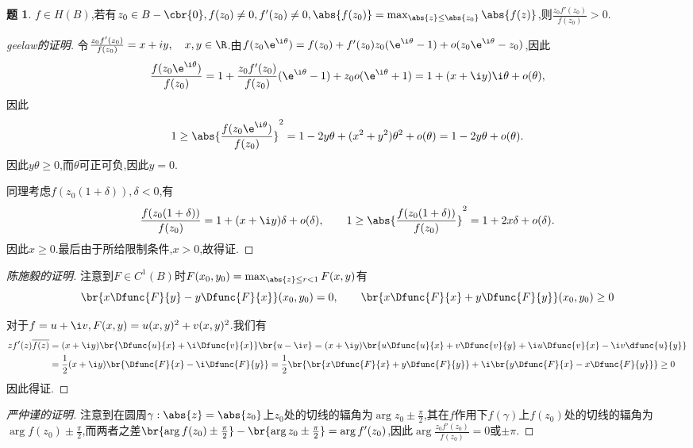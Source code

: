 \documentclass{article}
\theoremstyle{definition}
\newtheorem{exercise}{题}[section]
\begin{document}
\begin{exercise}
    $f\in H(B)$,若有$z_0\in B-\cbr{0}, f(z_0)\neq 0, f'(z_0)\neq 0, \abs{f(z_0)}=\max_{\abs{z}\leq \abs{z_0}}\abs{f(z)}$,则$\frac{z_0f'(z_0)}{f(z_0)}>0$.
\end{exercise}
\begin{proof}[geelaw的证明]
    令$\frac{z_0 f'(z_0)}{f(z_0)}=x+iy,\quad x,y\in\R$.由$f(z_0\e^{\i\theta})=f(z_0)+f'(z_0)z_0(\e^{\i\theta}-1)+o(z_0\e^{\i\theta}-z_0)$,因此
    $$\frac{f(z_0\e^{\i\theta})}{f(z_0)}=1+\frac{z_0f'(z_0)}{f(z_0)}(\e^{\i\theta}-1)+z_0o(\e^{\i\theta}+1)=1+(x+\i y)\i \theta+o(\theta),$$
    因此$$1\geq \abs{\frac{f(z_0\e^{\i\theta})}{f(z_0)}}^2=1-2y\theta+(x^2+y^2)\theta^2+o(\theta)=1-2y\theta+o(\theta).$$
    因此$y\theta\geq 0$,而$\theta$可正可负,因此$y=0$.

    同理考虑$f(z_0(1+\delta)),\delta<0$,有
    $$\frac{f(z_0(1+\delta))}{f(z_0)}=1+(x+\i y)\delta+o(\delta),\qquad 1\geq \abs{\frac{f(z_0(1+\delta))}{f(z_0)}}^2=1+2x\delta+o(\delta).$$
    因此$x\geq 0$.最后由于所给限制条件,$x>0$,故得证.
\end{proof}
\begin{proof}[陈施毅的证明]
    注意到$F\in C^1(B)$时$F(x_0,y_0)=\max_{\abs{z}\leq r<1}F(x,y)$有
    $$\br{x\Dfunc{F}{y}-y\Dfunc{F}{x}}(x_0,y_0)=0,\qquad \br{x\Dfunc{F}{x}+y\Dfunc{F}{y}}(x_0,y_0)\geq 0$$

    对于$f=u+\i v, F(x,y)=u(x,y)^2+v(x,y)^2$.我们有
    $$\begin{aligned}
        zf'(z)\overline{f(z)}&=(x+\i y)\br{\Dfunc{u}{x}+\i\Dfunc{v}{x}}\br{u-\i v}=(x+\i y)\br{u\Dfunc{u}{x}+v\Dfunc{v}{y}+\i u\Dfunc{v}{x}-\i v\dfunc{u}{y}}\\
        &=\frac{1}{2}(x+\i y)\br{\Dfunc{F}{x}-\i\Dfunc{F}{y}}=\frac{1}{2}\br{\br{x\Dfunc{F}{x}+y\Dfunc{F}{y}}+\i\br{y\Dfunc{F}{x}-x\Dfunc{F}{y}}}\geq 0
    \end{aligned}$$
    因此得证.
\end{proof}
\begin{proof}[严仲谨的证明]
    注意到在圆周$\gamma:\abs{z}=\abs{z_0}$上$z_0$处的切线的辐角为$\arg z_0\pm\frac{\pi}{2}$,其在$f$作用下$f(\gamma)$上$f(z_0)$处的切线的辐角为$\arg f(z_0)\pm\frac{\pi}{2}$,而两者之差$\br{\arg f(z_0)\pm\frac{\pi}{2}}-\br{\arg z_0\pm\frac{\pi}{2}}=\arg f'(z_0)$,因此$\arg \frac{z_0f'(z_0)}{f(z_0)}=0$或$\pm\pi$.
    
    \tbc
\end{proof}
\end{document}
